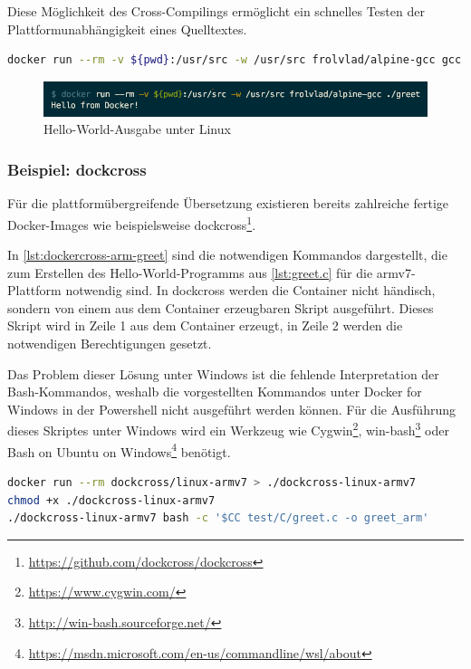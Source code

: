 Diese Möglichkeit des Cross-Compilings ermöglicht ein schnelles Testen der Plattformunabhängigkeit eines Quelltextes.



\begin{lstlisting}[caption=Docker-Kommando zum Übersetzen eines C-Programmes mit gcc, language=bash, label=lst:docker-run-gcc]
docker run --rm -v ${pwd}:/usr/src -w /usr/src frolvlad/alpine-gcc gcc -o greet greet.c
\end{lstlisting}

\begin{figure}[htbp]
    \centering
    \includegraphics[width=0.8\linewidth,clip]{images/greet-output}
    \caption{Hello-World-Ausgabe unter Linux}
\label{fig:greet-output}
\end{figure}

\subsubsection{Beispiel: dockcross}
Für die plattformübergreifende Übersetzung existieren bereits zahlreiche fertige Docker-Images wie beispielsweise dockcross\footnote{\url{https://github.com/dockcross/dockcross}}.

In \cref{lst:dockercross-arm-greet} sind die notwendigen Kommandos dargestellt, die zum Erstellen des Hello-World-Programms aus \cref{lst:greet.c} für die armv7-Plattform notwendig sind.
In dockcross werden die Container nicht händisch, sondern von einem aus dem Container erzeugbaren Skript ausgeführt.
Dieses Skript wird in Zeile 1 aus dem Container erzeugt, in Zeile 2 werden die notwendigen Berechtigungen gesetzt.

Das Problem dieser Lösung unter Windows ist die fehlende Interpretation der Bash-Kommandos, weshalb die vorgestellten Kommandos unter Docker for Windows in der Powershell nicht ausgeführt werden können.
Für die Ausführung dieses Skriptes unter Windows wird ein Werkzeug wie Cygwin\footnote{\url{https://www.cygwin.com/}}, win-bash\footnote{\url{http://win-bash.sourceforge.net/}} oder Bash on Ubuntu on Windows\footnote{\url{https://msdn.microsoft.com/en-us/commandline/wsl/about}} benötigt.

\begin{lstlisting}[caption=Kommandos zum Übersetzen mit dockcross, language=bash, label=lst:dockercross-arm-greet]
docker run --rm dockcross/linux-armv7 > ./dockcross-linux-armv7
chmod +x ./dockcross-linux-armv7
./dockcross-linux-armv7 bash -c '$CC test/C/greet.c -o greet_arm'
\end{lstlisting}

